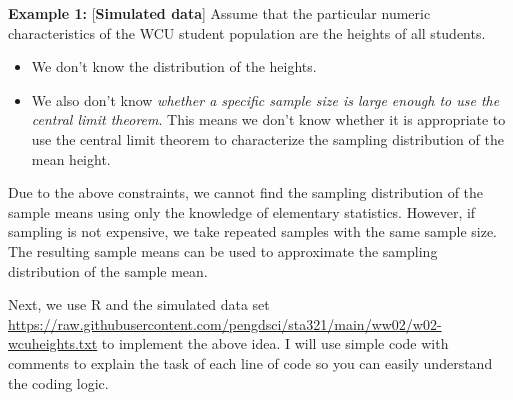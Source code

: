\documentclass[
]{book}
\newenvironment{Shaded}{\begin{snugshade}}{\end{snugshade}}
\newcommand{\AttributeTok}[1]{\textcolor[rgb]{0.13,0.29,0.53}{#1}}
\newcommand{\CommentTok}[1]{\textcolor[rgb]{0.56,0.35,0.01}{\textit{#1}}}
\newcommand{\ConstantTok}[1]{\textcolor[rgb]{0.56,0.35,0.01}{#1}}
\newcommand{\ControlFlowTok}[1]{\textcolor[rgb]{0.13,0.29,0.53}{\textbf{#1}}}
\newcommand{\DecValTok}[1]{\textcolor[rgb]{0.00,0.00,0.81}{#1}}
\newcommand{\FunctionTok}[1]{\textcolor[rgb]{0.13,0.29,0.53}{\textbf{#1}}}
\newcommand{\NormalTok}[1]{#1}
\newcommand{\OtherTok}[1]{\textcolor[rgb]{0.56,0.35,0.01}{#1}}
\newcommand{\SpecialCharTok}[1]{\textcolor[rgb]{0.81,0.36,0.00}{\textbf{#1}}}
\newcommand{\StringTok}[1]{\textcolor[rgb]{0.31,0.60,0.02}{#1}}
\begin{document}
\textbf{Example 1:} {[}\textbf{Simulated data}{]} Assume that the particular numeric characteristics of the WCU student population are the heights of all students.

\begin{itemize}
\item
  We don't know the distribution of the heights.
\item
  We also don't know \emph{whether a specific sample size is large enough to use the central limit theorem}. This means we don't know whether it is appropriate to use the central limit theorem to characterize the sampling distribution of the mean height.
\end{itemize}

Due to the above constraints, we cannot find the sampling distribution of the sample means using only the knowledge of elementary statistics. However, if sampling is not expensive, we take repeated samples with the same sample size. The resulting sample means can be used to approximate the sampling distribution of the sample mean.

Next, we use R and the simulated data set \url{https://raw.githubusercontent.com/pengdsci/sta321/main/ww02/w02-wcuheights.txt} to implement the above idea. I will use simple code with comments to explain the task of each line of code so you can easily understand the coding logic.

\begin{Shaded}
\end{Shaded}
\end{document}
